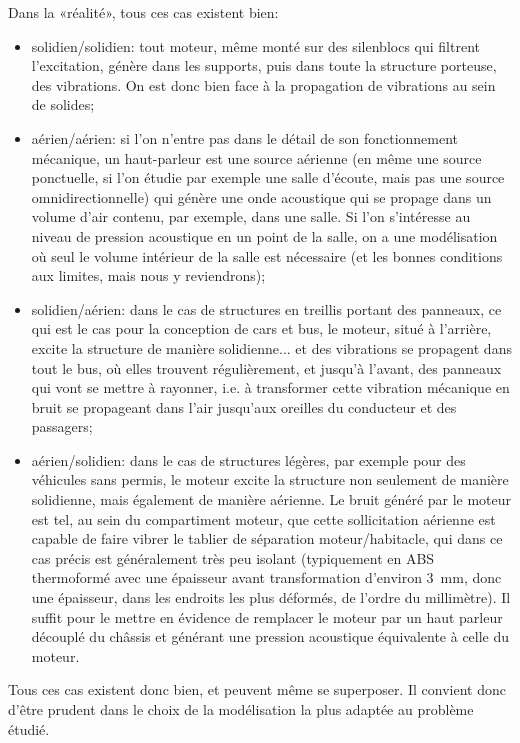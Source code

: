 \medskip
Dans la «réalité», tous ces cas existent bien:
\begin{itemize}
  \item solidien/solidien: tout moteur, même monté sur des silenblocs qui filtrent l'excitation, génère dans les supports, puis dans toute la structure porteuse, des vibrations. On est donc bien face à la propagation de vibrations au sein de solides;
  \item aérien/aérien: si l'on n'entre pas dans le détail de son fonctionnement mécanique, un haut-parleur est une source aérienne (en même une source ponctuelle, si l'on étudie par exemple une salle d'écoute, mais pas une source omnidirectionnelle) qui génère une onde acoustique qui se propage dans un volume d'air contenu, par exemple, dans une salle. Si l'on s'intéresse au niveau de pression acoustique en un point de la salle, on a une modélisation où seul le volume intérieur de la salle est nécessaire (et les bonnes conditions aux limites, mais nous y reviendrons);
    \item solidien/aérien: dans le cas de structures en treillis portant des panneaux, ce qui est le cas pour la conception de cars et bus, le moteur, situé à l'arrière, excite la structure de manière solidienne... et des vibrations se propagent dans tout le bus, où elles trouvent régulièrement, et jusqu'à l'avant, des panneaux qui vont se mettre à rayonner, i.e. à transformer cette vibration mécanique en bruit se propageant dans l'air jusqu'aux oreilles du conducteur et des passagers;
  \item aérien/solidien: dans le cas de structures légères, par exemple pour des véhicules sans permis, le moteur excite la structure non seulement de manière solidienne, mais également de manière aérienne. Le bruit généré par le moteur est tel, au sein du compartiment moteur, que cette sollicitation aérienne est capable de faire vibrer le tablier de séparation moteur/habitacle, qui dans ce cas précis est généralement très peu isolant (typiquement en ABS thermoformé avec une épaisseur avant transformation d'environ 3~mm, donc une épaisseur, dans les endroits les plus déformés, de l'ordre du millimètre). Il suffit pour le mettre en évidence de remplacer le moteur par un haut parleur découplé du châssis et générant une pression acoustique équivalente à celle du moteur.  
\end{itemize}
Tous ces cas existent donc bien, et peuvent même se superposer. Il convient donc d'être prudent dans le choix de la modélisation la plus adaptée au problème étudié.

